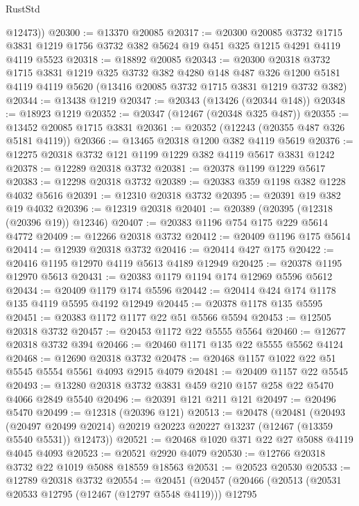 \begin{lexlean}{RustStd}
\begin{coremodule}
        @12473))
@20300 := @13370 @20085
@20317 := @20300
    @20085
    @3732
    @1715
    @3831
    @1219
    @1756
    @3732
    @382
    @5624
    @19
    @451
    @325
    @1215
    @4291
    @4119
    @4119
    @5523
@20318 := @18892 @20085
@20343 := @20300
    @20318
    @3732
    @1715
    @3831
    @1219
    @325
    @3732
    @382
    @4280
    @148
    @487
    @326
    @1200
    @5181
    @4119
    @4119
    @5620
    (@13416 @20085 @3732 @1715 @3831 @1219 @3732 @382)
@20344 := @13438 @1219
@20347 := @20343 (@13426 (@20344 @148))
@20348 := @18923 @1219
@20352 := @20347 (@12467 (@20348 @325 @487))
@20355 := @13452 @20085 @1715 @3831
@20361 := @20352 (@12243 (@20355 @487 @326 @5181 @4119))
@20366 := @13465 @20318 @1200 @382 @4119 @5619
@20376 := @12275 @20318 @3732 @121 @1199 @1229 @382 @4119 @5617 @3831 @1242
@20378 := @12289 @20318 @3732
@20381 := @20378 @1199 @1229 @5617
@20383 := @12298 @20318 @3732
@20389 := @20383 @359 @1198 @382 @1228 @4032 @5616
@20391 := @12310 @20318 @3732
@20395 := @20391 @19 @382 @19 @4032
@20396 := @12319 @20318
@20401 := @20389 (@20395 (@12318 (@20396 @19)) @12346)
@20407 := @20383 @1196 @754 @175 @229 @5614 @4772
@20409 := @12266 @20318 @3732
@20412 := @20409 @1196 @175 @5614
@20414 := @12939 @20318 @3732
@20416 := @20414 @427 @175
@20422 := @20416 @1195 @12970 @4119 @5613 @4189 @12949
@20425 := @20378 @1195 @12970 @5613
@20431 := @20383 @1179 @1194 @174 @12969 @5596 @5612
@20434 := @20409 @1179 @174 @5596
@20442 := @20414 @424 @174 @1178 @135 @4119 @5595 @4192 @12949
@20445 := @20378 @1178 @135 @5595
@20451 := @20383 @1172 @1177 @22 @51 @5566 @5594
@20453 := @12505 @20318 @3732
@20457 := @20453 @1172 @22 @5555 @5564
@20460 := @12677 @20318 @3732 @394
@20466 := @20460 @1171 @135 @22 @5555 @5562 @4124
@20468 := @12690 @20318 @3732
@20478 := @20468 @1157 @1022 @22 @51 @5545 @5554 @5561 @4093 @2915 @4079
@20481 := @20409 @1157 @22 @5545
@20493 := @13280 @20318 @3732 @3831 @459 @210 @157 @258 @22 @5470 @4066 @2849 @5540
@20496 := @20391 @121 @211 @121
@20497 := @20496 @5470
@20499 := @12318 (@20396 @121)
@20513 := @20478
    (@20481
      (@20493
        (@20497 @20499 @20214)
        @20219
        @20223
        @20227
        @13237
        (@12467 (@13359 @5540 @5531))
        @12473))
@20521 := @20468 @1020 @371 @22 @27 @5088 @4119 @4045 @4093
@20523 := @20521 @2920 @4079
@20530 := @12766 @20318 @3732 @22 @1019 @5088 @18559 @18563
@20531 := @20523 @20530
@20533 := @12789 @20318 @3732
@20554 := @20451
    (@20457
      (@20466
        (@20513
          (@20531 @20533 @12795 (@12467 (@12797 @5548 @4119)))
          @12795

\end{coremodule}
\end{lexlean}
